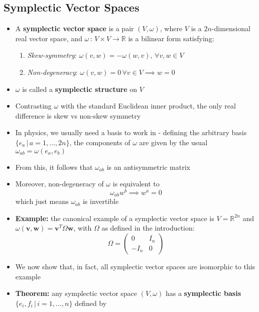\documentclass[12pt,a4paper]{article}
\numberwithin{equation}{section}
\begin{document}
	\subsection{Symplectic Vector Spaces}
	\begin{itemize}
		\item A \textbf{symplectic vector space} is a pair $(V,\omega)$, where $V$ is a $2n$-dimensional real vector space, and $\omega\,:\,V\times V\to \mathbb{R}$ is a bilinear form satisfying:
		\begin{enumerate}
			\item \textit{Skew-symmetry}: $\omega(v,w)=-\omega(w,v),\,\forall v,w\in V$
			\item \textit{Non-degeneracy}: $\omega(v,w)=0\,\forall v\in V \implies w=0$
		\end{enumerate}
		\item $\omega$ is called a \textbf{symplectic structure} on $V$
		\item Contrasting $\omega$ with the standard Euclidean inner product, the only real difference is skew vs non-skew symmetry
		\item In physics, we usually need a basis to work in - defining the arbitrary basis $\{e_{a}\,|\,a=1,\ldots, 2n\}$, the components of $\omega$ are given by the usual $\omega_{ab}=\omega(e_{a},e_{b})$
		\item From this, it follows that $\omega_{ab}$ is an antisymmetric matrix
		\item Moreover, non-degeneracy of $\omega$ is equivalent to
		\begin{equation}
			\omega_{ab}w^{b}\implies w^{a}=0
		\end{equation}
		which just means $\omega_{ab}$ is invertible
		\item \textbf{Example:} the canonical example of a symplectic vector space is $V=\mathbb{R}^{2n}$ and $\omega(\mathbf{v},\mathbf{w})=\mathbf{v}^{T}\Omega\mathbf{w}$, with $\Omega$ as defined in the introduction:
		\begin{equation}
			\Omega=\begin{pmatrix}
				0&I_{n}\\-I_{n}&0
			\end{pmatrix}
		\end{equation}
		\item We now show that, in fact, all symplectic vector spaces are isomorphic to this example
		\item \textbf{Theorem:} any symplectic vector space $(V,\omega)$ has a \textbf{symplectic basis} $\{e_{i},f_{i}\,|\,i=1,\ldots,n\}$ defined by

\end{itemize}
\end{document}
